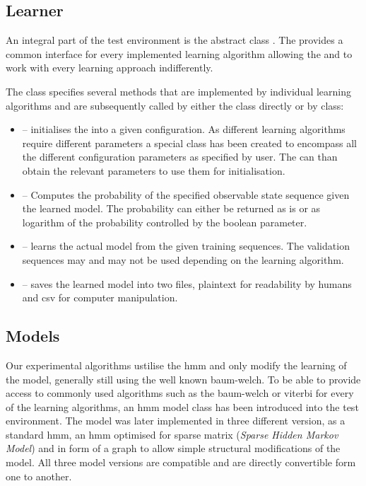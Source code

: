 \subsection{Learner}
An integral part of the test environment is the abstract class . The  provides a common interface for every implemented learning algorithm allowing the  and  to work with every learning approach indifferently.

The  class specifies several methods that are implemented by individual learning algorithms and are subsequently called by either the  class directly or by  class:

\begin{itemize}
	\item[]  -- initialises the  into a given configuration. As different learning algorithms require different parameters a special class  has been created to encompass all the different configuration parameters as specified by user. The  can than obtain the relevant parameters to use them for initialisation.
	\item[]  -- Computes the probability of the specified observable state sequence given the learned model. The probability can either be returned as is or as logarithm of the probability controlled by the boolean  parameter.
	\item[]  -- learns the actual model from the given training sequences. The validation sequences may and may not be used depending on the learning algorithm.
	\item[]  -- saves the learned model into two files, plaintext for readability by humans and \gls{csv} for computer manipulation.
\end{itemize}

\subsection{Models}

Our experimental algorithms ustilise the \acrlong{hmm} and only modify the learning of the model, generally still using the well known \gls{baum-welch}. To be able to provide access to commonly used algorithms such as the \gls{baum-welch} or \gls{viterbi} for every of the learning algorithms, an \gls{hmm} model class has been introduced into the test environment. The model was later implemented in three different version, as a standard \gls{hmm}, an \gls{hmm} optimised for sparse matrix (\emph{Sparse Hidden Markov Model}) and in form of a graph to allow simple structural modifications of the model. All three model versions are compatible and are directly convertible form one to another.

